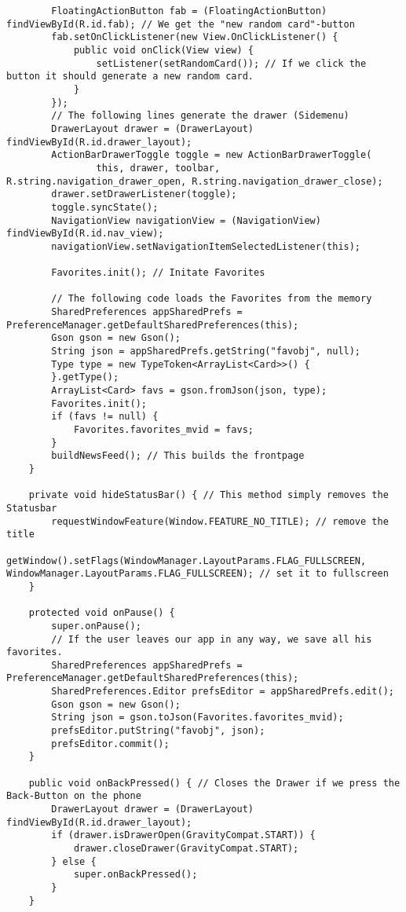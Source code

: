 \begin{lstlisting}
        FloatingActionButton fab = (FloatingActionButton) findViewById(R.id.fab); // We get the "new random card"-button
        fab.setOnClickListener(new View.OnClickListener() {
            public void onClick(View view) {
                setListener(setRandomCard()); // If we click the button it should generate a new random card.
            }
        });
        // The following lines generate the drawer (Sidemenu)
        DrawerLayout drawer = (DrawerLayout) findViewById(R.id.drawer_layout);
        ActionBarDrawerToggle toggle = new ActionBarDrawerToggle(
                this, drawer, toolbar, R.string.navigation_drawer_open, R.string.navigation_drawer_close);
        drawer.setDrawerListener(toggle);
        toggle.syncState();
        NavigationView navigationView = (NavigationView) findViewById(R.id.nav_view);
        navigationView.setNavigationItemSelectedListener(this);

        Favorites.init(); // Initate Favorites

        // The following code loads the Favorites from the memory
        SharedPreferences appSharedPrefs = PreferenceManager.getDefaultSharedPreferences(this);
        Gson gson = new Gson();
        String json = appSharedPrefs.getString("favobj", null);
        Type type = new TypeToken<ArrayList<Card>>() {
        }.getType();
        ArrayList<Card> favs = gson.fromJson(json, type);
        Favorites.init();
        if (favs != null) {
            Favorites.favorites_mvid = favs;
        }
        buildNewsFeed(); // This builds the frontpage
    }

    private void hideStatusBar() { // This method simply removes the Statusbar
        requestWindowFeature(Window.FEATURE_NO_TITLE); // remove the title
        getWindow().setFlags(WindowManager.LayoutParams.FLAG_FULLSCREEN, WindowManager.LayoutParams.FLAG_FULLSCREEN); // set it to fullscreen
    }

    protected void onPause() {
        super.onPause();
        // If the user leaves our app in any way, we save all his favorites.
        SharedPreferences appSharedPrefs = PreferenceManager.getDefaultSharedPreferences(this);
        SharedPreferences.Editor prefsEditor = appSharedPrefs.edit();
        Gson gson = new Gson();
        String json = gson.toJson(Favorites.favorites_mvid);
        prefsEditor.putString("favobj", json);
        prefsEditor.commit();
    }

    public void onBackPressed() { // Closes the Drawer if we press the Back-Button on the phone
        DrawerLayout drawer = (DrawerLayout) findViewById(R.id.drawer_layout);
        if (drawer.isDrawerOpen(GravityCompat.START)) {
            drawer.closeDrawer(GravityCompat.START);
        } else {
            super.onBackPressed();
        }
    }


\end{lstlisting}
